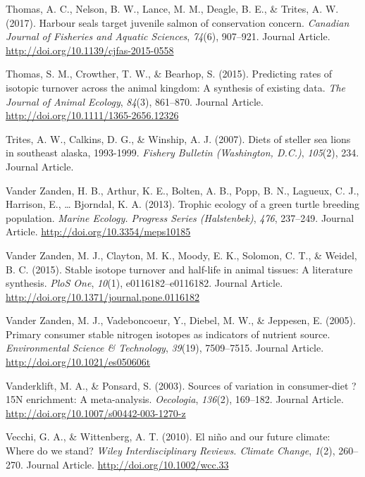\documentclass [11pt, proquest] {uwthesis}[2015/03/03]
\begin{document}
\hypertarget{ref-Thomas2017}{}
Thomas, A. C., Nelson, B. W., Lance, M. M., Deagle, B. E., \& Trites, A.
W. (2017). Harbour seals target juvenile salmon of conservation concern.
\emph{Canadian Journal of Fisheries and Aquatic Sciences}, \emph{74}(6),
907--921. Journal Article. \url{http://doi.org/10.1139/cjfas-2015-0558}

\hypertarget{ref-Thomas2015}{}
Thomas, S. M., Crowther, T. W., \& Bearhop, S. (2015). Predicting rates
of isotopic turnover across the animal kingdom: A synthesis of existing
data. \emph{The Journal of Animal Ecology}, \emph{84}(3), 861--870.
Journal Article. \url{http://doi.org/10.1111/1365-2656.12326}

\hypertarget{ref-Trites2007}{}
Trites, A. W., Calkins, D. G., \& Winship, A. J. (2007). Diets of
steller sea lions in southeast alaska, 1993-1999. \emph{Fishery Bulletin
(Washington, D.C.)}, \emph{105}(2), 234. Journal Article.

\hypertarget{ref-VanderZanden2013}{}
Vander Zanden, H. B., Arthur, K. E., Bolten, A. B., Popp, B. N.,
Lagueux, C. J., Harrison, E., \ldots{} Bjorndal, K. A. (2013). Trophic
ecology of a green turtle breeding population. \emph{Marine Ecology.
Progress Series (Halstenbek)}, \emph{476}, 237--249. Journal Article.
\url{http://doi.org/10.3354/meps10185}

\hypertarget{ref-VanderZanden2015}{}
Vander Zanden, M. J., Clayton, M. K., Moody, E. K., Solomon, C. T., \&
Weidel, B. C. (2015). Stable isotope turnover and half-life in animal
tissues: A literature synthesis. \emph{PloS One}, \emph{10}(1),
e0116182--e0116182. Journal Article.
\url{http://doi.org/10.1371/journal.pone.0116182}

\hypertarget{ref-VanderZanden2005}{}
Vander Zanden, M. J., Vadeboncoeur, Y., Diebel, M. W., \& Jeppesen, E.
(2005). Primary consumer stable nitrogen isotopes as indicators of
nutrient source. \emph{Environmental Science \& Technology},
\emph{39}(19), 7509--7515. Journal Article.
\url{http://doi.org/10.1021/es050606t}

\hypertarget{ref-Vanderklift2003}{}
Vanderklift, M. A., \& Ponsard, S. (2003). Sources of variation in
consumer-diet ?15N enrichment: A meta-analysis. \emph{Oecologia},
\emph{136}(2), 169--182. Journal Article.
\url{http://doi.org/10.1007/s00442-003-1270-z}

\hypertarget{ref-Vecchi2010}{}
Vecchi, G. A., \& Wittenberg, A. T. (2010). El niño and our future
climate: Where do we stand? \emph{Wiley Interdisciplinary Reviews.
Climate Change}, \emph{1}(2), 260--270. Journal Article.
\url{http://doi.org/10.1002/wcc.33}
\end{document}
